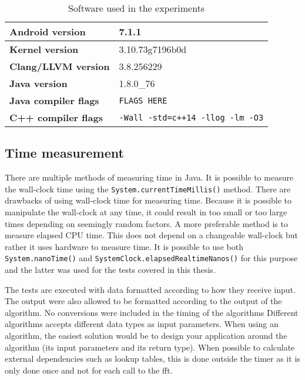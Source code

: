 \ifrelease
\begin{table}[H]
    \centering
    \caption{Software used in the experiments}
    \begin{tabular}{|l|l|}
        \hline
        \textbf{Android version} & 7.1.1\\
        \hline
        \textbf{Kernel version} & 3.10.73g7196b0d\\
        \hline
        \textbf{Clang/LLVM version} & 3.8.256229\\
        \hline
        \textbf{Java version} & 1.8.0\_76\\
        \hline
        \textbf{Java compiler flags} & \texttt{FLAGS HERE}\\
        \hline
        \textbf{C++ compiler flags} & \texttt{-Wall -std=c++14 -llog -lm -O3}\\
        \hline
    \end{tabular}
    \label{tab:software}
\end{table}
\fi

\subsection{Time measurement}
There are multiple methods of measuring time in Java. It is possible to measure the wall-clock time using the \texttt{System.currentTimeMillis()} method. There are drawbacks of using wall-clock time for measuring time. Because it is possible to manipulate the wall-clock at any time, it could result in too small or too large times depending on seemingly random factors. A more preferable method is to measure elapsed CPU time. This does not depend on a changeable wall-clock but rather it uses hardware to measure time. It is possible to use both \texttt{System.nanoTime()} and \texttt{SystemClock.elapsedRealtimeNanos()} for this purpose and the latter was used for the tests covered in this thesis.

The tests are executed with data formatted according to how they receive input. The output were also allowed to be formatted according to the output of the algorithm. No conversions were included in the timing of the algorithms Different algorithms accepts different data types as input parameters. When using an algorithm, the easiest solution would be to design your application around the algorithm (its input parameters and its return type). When possible to calculate external dependencies such as lookup tables, this is done outside the timer as it is only done once and not for each call to the \gls{fft}.

